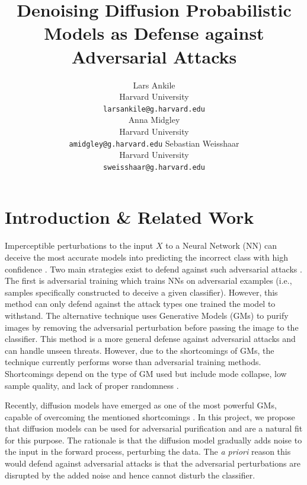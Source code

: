 \documentclass[twocolumn]{article}
\title{Denoising Diffusion Probabilistic Models as Defense against Adversarial Attacks}
\author{ 
    Lars Ankile\\
Harvard University\\
\texttt{larsankile@g.harvard.edu} \\
\And
    Anna Midgley \\
Harvard University\\
\texttt{amidgley@g.harvard.edu}
\And
Sebastian Weisshaar \\
Harvard University \\
\texttt{sweisshaar@g.harvard.edu} \\
}
\begin{document}

\raggedbottom

\section{Introduction \& Related Work}
Imperceptible perturbations to the input $X$ to a Neural Network (NN) can deceive the most accurate models into predicting the incorrect class with high confidence \cite{szegedy2013intriguing}. Two main strategies exist to defend against such adversarial attacks \cite{DiffPure}. The first is adversarial training which trains NNs on adversarial examples (i.e., samples specifically constructed to deceive a given classifier). However, this method can only defend against the attack types one trained the model to withstand. The alternative technique uses Generative Models (GMs) to purify images by removing the adversarial perturbation before passing the image to the classifier. This method is a more general defense against adversarial attacks and can handle unseen threats. However, due to the shortcomings of GMs, the technique currently performs worse than adversarial training methods. Shortcomings depend on the type of GM used but include mode collapse, low sample quality, and lack of proper randomness \cite{DiffPure}.

Recently, diffusion models have emerged as one of the most powerful GMs, capable of overcoming the mentioned shortcomings \cite{DiffusionPaper}. In this project, we propose that diffusion models can be used for adversarial purification and are a natural fit for this purpose. The rationale is that the diffusion model gradually adds noise to the input in the forward process, perturbing the data. The \textit{a priori} reason this would defend against adversarial attacks is that the adversarial perturbations are disrupted by the added noise and hence cannot disturb the classifier. 
\end{document}
